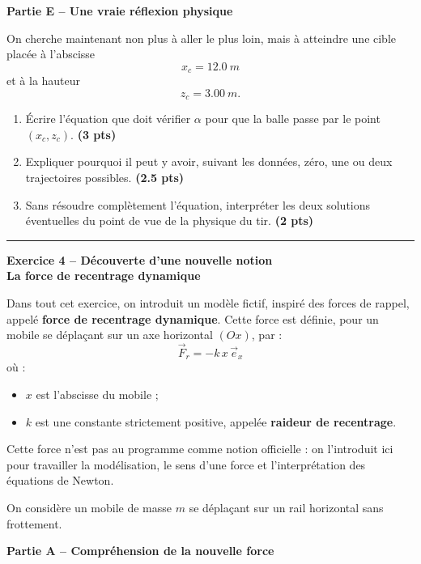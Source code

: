 \documentclass[11pt,a4paper]{article}
\newcommand{\vect}[1]{\overrightarrow{#1}}
\newcommand{\e}[1]{\vec{e}_{#1}}
\newcommand{\bareme}[1]{\hfill{\color{blue!70!black}\textbf{(#1 pts)}}}
\newcommand{\important}[1]{\textbf{#1}}
\begin{document}
\medskip

\textbf{Partie E -- Une vraie réflexion physique}

On cherche maintenant non plus à aller le plus loin, mais à atteindre une cible placée à l’abscisse
\[
x_c=\SI{12.0}{m}
\]
et à la hauteur
\[
z_c=\SI{3.00}{m}.
\]

\begin{enumerate}[label=\textbf{E.\arabic*.}, leftmargin=0.9cm]
    \item Écrire l’équation que doit vérifier $\alpha$ pour que la balle passe par le point $(x_c,z_c)$. \bareme{3}
    \item Expliquer pourquoi il peut y avoir, suivant les données, zéro, une ou deux trajectoires possibles. \bareme{2.5}
    \item Sans résoudre complètement l’équation, interpréter les deux solutions éventuelles du point de vue de la physique du tir. \bareme{2}
\end{enumerate}

\vspace{0.4cm}
\hrule
\vspace{0.4cm}

\begin{center}
\textbf{\large Exercice 4 -- Découverte d’une nouvelle notion}\\
\textbf{La force de recentrage dynamique}
\end{center}

Dans tout cet exercice, on introduit un modèle fictif, inspiré des forces de rappel, appelé \important{force de recentrage dynamique}. Cette force est définie, pour un mobile se déplaçant sur un axe horizontal $(Ox)$, par :
\[
\vect{F}_r=-k\,x\,\e{x}
\]
où :
\begin{itemize}[leftmargin=0.7cm]
    \item $x$ est l’abscisse du mobile ;
    \item $k$ est une constante strictement positive, appelée \important{raideur de recentrage}.
\end{itemize}

Cette force n’est pas au programme comme notion officielle : on l’introduit ici pour travailler la modélisation, le sens d’une force et l’interprétation des équations de Newton.

On considère un mobile de masse $m$ se déplaçant sur un rail horizontal sans frottement.

\medskip

\textbf{Partie A -- Compréhension de la nouvelle force}
\end{document}
